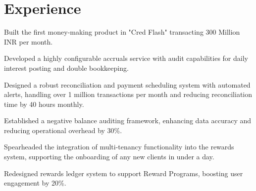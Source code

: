 \documentclass[]{sachin-resume-openfont}
\begin{document}
\begin{minipage}[t]{0.69\textwidth} 


\section{Experience}

\vspace{2em}
\begin{tightemize}
\item Built the first money-making product in "Cred Flash" transacting 300 Million INR per month.
\item Developed a highly configurable accruals service with audit capabilities for daily interest posting and double bookkeeping.
\item Designed a robust reconciliation and payment scheduling system with automated alerts, handling over 1 million transactions per month and reducing reconciliation time by 40 hours monthly.
\item Established a negative balance auditing framework, enhancing data accuracy and reducing operational overhead by 30\%.
\end{tightemize}
\sectionsep

\vspace{\topsep}
\begin{tightemize}
\item Spearheaded the integration of multi-tenancy functionality into the rewards system, supporting the onboarding of any new clients in under a day.
\item Redesigned rewards ledger system to support Reward Programs, boosting user engagement by 20\%.
\end{tightemize}
\sectionsep


\end{minipage}
\end{document}
